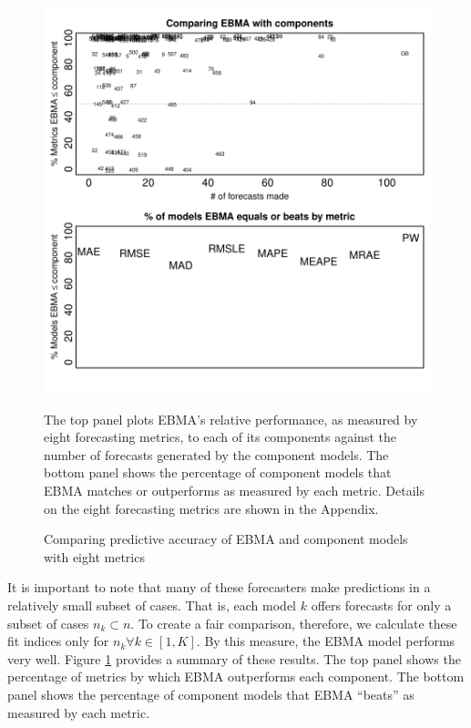 \documentclass[12pt,fullpage,endnotes]{article}
\begin{document}
\begin{figure}[h]
\caption{Comparing predictive accuracy of EBMA and component models with eight metrics}
\label{compare2Components}
\begin{center}
\includegraphics{compare2Components}
\end{center}

The top panel plots EBMA's relative performance, as measured by eight
forecasting metrics, to each of its components against the number of
forecasts generated by the component models.  The bottom panel shows
the percentage of component models that EBMA matches or outperforms as
measured by each metric.  Details on the eight forecasting metrics are
shown in the Appendix.


\end{figure}

It is important to note that many of these forecasters make
predictions in a relatively small subset of cases.  That is, each
model $k$ offers forecasts for only a subset of cases $n_k \subset n$.
To create a fair comparison, therefore, we calculate these fit indices
only for $n_k \forall k \in [1,K]$.  By this measure, the EBMA model
performs very well.  Figure \ref{compare2Components} provides a
summary of these results.  The top panel shows the percentage of
metrics by which EBMA outperforms each component. The bottom panel
shows the percentage of component models that EBMA ``beats'' as
measured by each metric.
\end{document}
